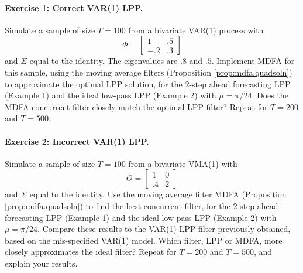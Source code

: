 \documentclass[a4paper]{book}
\begin{document}
\vspace{.5cm}

\paragraph{Exercise 1: Correct VAR(1) LPP.}  Simulate a sample of size $T=100$ from a
  bivariate VAR(1) process with 
\[
  \Phi = \left[ \begin{array}{ll} 1 & .5 \\ -.2 & .3 \end{array} \right]
\]
 and $\Sigma$ equal to the identity.  The eigenvalues are $.8$ and $.5$.
  Implement MDFA for this sample, using the moving average filters
 (Proposition \ref{prop:mdfa.quadsoln}) to approximate the optimal
 LPP solution, for the $2$-step
 ahead forecasting LPP (Example 1) and the ideal low-pass LPP (Example 2)
 with    $\mu = \pi/24$.  Does the MDFA concurrent filter closely
 match the optimal LPP filter?  Repeat for $T=200$ and $T=500$.


\paragraph{Exercise 2: Incorrect VAR(1) LPP.}  Simulate a sample of size
  $T=100$ from  a bivariate  VMA(1) with
\[
 \Theta = \left[ \begin{array}{ll} 1 & 0 \\ .4 & 2 \end{array} \right]
\]
  and $\Sigma$ equal to the identity.  Use the moving average filter
 MDFA  (Proposition \ref{prop:mdfa.quadsoln}) to find the best
 concurrent filter, for the $2$-step
 ahead forecasting LPP (Example 1) and the ideal low-pass LPP (Example 2)
 with    $\mu = \pi/24$.  Compare these results to the 
  VAR(1) LPP filter previously obtained, based on the mis-specified
 VAR(1) model.  Which filter, LPP or MDFA, more closely approximates
 the ideal filter?   Repeat for $T=200$ and $T=500$, and explain your results.




 
 


\end{document}
